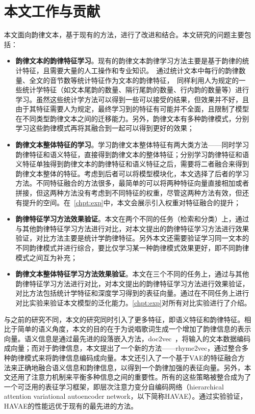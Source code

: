 \section{本文工作与贡献}
本文面向韵律文本，基于现有的方法，进行了改进和结合。本文研究的问题主要包括：

\begin{itemize}
  \item {\bf 韵律文本的韵律特征学习}。现有的韵律文本韵律学习方法主要是基于韵律的统计特征，且需要大量的人工操作和专业知识。~\cite{hirjee2010rhyme}通过统计文本中每行的韵律数量、全文的音节数等统计特征作为文本的韵律特征，~\cite{Malmi2016dopelearning}同样利用人为规定的一些统计学特征（如文本尾韵的数量、隔行尾韵的数量、行内韵的数量等）进行学习。虽然这些统计学方法可以得到一些可以接受的结果，但效果并不好，且由于其特征需要人为规定，最终学习到的特征有可能并不全面，且限制了模型在不同类型韵律文本之间的迁移能力。另外，韵律文本有多种韵律模式，分别学习这些韵律模式再将其融合到一起可以得到更好的效果；
  \item {\bf 韵律文本整体特征的学习}。学习韵律文本整体特征有两大类方法——同时学习韵律特征和语义特征，直接得到韵律文本的整体特征；分别学习韵律特征和语义特征单独得到韵律文本的韵律特征和语义特征之后，需要将二者融合来得到韵律文本整体的特征。考虑到后者可以将模型模块化，本文选择了后者的学习方法。不同特征融合的方法很多，最简单的可以将两种特征向量直接相加或者拼接，但这两种方法没有考虑到不同特征的权重，尽管这两种方法有效，但还有提升的空间。在~\ref{chpt:exp}中，本文会展示引入权重对特征融合的提升；
  \item {\bf 韵律特征学习方法效果验证}。本文在两个不同的任务（检索和分类）上，通过与其他韵律特征学习方法进行对比，对本文提出的韵律特征学习方法进行效果验证，对比方法主要是统计学韵律特征。另外本文还需要验证学习同一文本的不同韵律模式并进行综合，要比仅学习某一种韵律模式效果更好，即不同韵律模式之间互为补充；
  \item {\bf 韵律文本整体特征学习方法效果验证}。本文在三个不同的任务上，通过与其他韵律特征学习方法进行对比，对本文提出的韵律特征学习方法进行效果验证，对比方法包括统计学特征和深度学习得到的表征向量。通过在不同任务上进行对比实验来验证本文模型的泛化能力。\ref{chpt:exp}对所有对比实验进行了介绍。
\end{itemize}
\par

与之前的研究不同，本文的研究同时引入了更多特征，即语义特征和韵律特征。相比于简单的语义角度，本文的目的在于为说唱歌词生成一个增加了韵律信息的表示向量。语义信息是通过最先进的段落嵌入方法，doc2vec~\cite{quoc2014distributed}，将输入的文本数据编码成向量；而对于韵律信息，本文提出了一个新的方法——rhyme2vec，通过整合多种韵律模式来将韵律信息编码成向量。本文还引入了一个基于VAE的特征融合方法来正确地融合语义信息和韵律信息，以得到一个韵律加强的表征向量。另外，本文还用了注意力机制来平衡多种信息之间的重要性。所有的这些策略被整合成为了一个可泛用的表征学习框架，即层次注意力变分自编码网络（hierarchical attention variational autoencoder network，以下简称HAVAE）。通过实验验证，HAVAE的性能远优于现有的最先进的方法。\par


